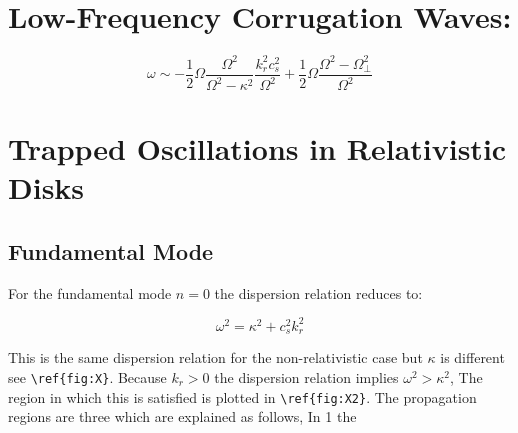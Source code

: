 \section{Low-Frequency Corrugation Waves:}

\begin{equation}
\omega \sim -\dfrac{1}{2} \Omega \dfrac{\Omega^2}{\Omega^2 -
\kappa^2} \dfrac{k_r^2 c_s^2 }{\Omega^2} + \dfrac{1}{2} \Omega
\dfrac{\Omega^2 - \Omega_{\bot}^2}{\Omega^2}
\end{equation}


\section{Trapped Oscillations in Relativistic Disks}

\subsection{Fundamental Mode}

For the fundamental mode $n=0$ the dispersion relation reduces to:

\begin{equation}
\omega^2 = \kappa^2 + c_s^2k_r^2
\end{equation}

This is the same dispersion relation for the non-relativistic
case but $\kappa$ is different see \verb+\ref{fig:X}+.
Because $k_r > 0$ the dispersion relation implies $\omega^2 >
\kappa^2$, The region in which this is satisfied is plotted in 
\verb+\ref{fig:X2}+. The propagation regions are three which
are explained as follows, In 1 the 


